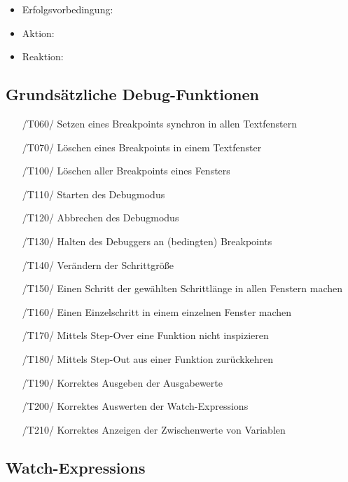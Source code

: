 \documentclass[parskip=full]{scrartcl}
\begin{document}
	
	
	\begin{itemize}
		\item Erfolgsvorbedingung:
		
		
		\item Aktion:
		
		
		\item Reaktion:
		
		
	\end{itemize}	

\subsection{Grundsätzliche Debug-Funktionen}

\begin{itemize}

	\item[/T060/] Setzen eines \glspl{Breakpoint} synchron in allen Textfenstern
	\item[/T070/] Löschen eines \glspl{Breakpoint} in einem Textfenster
	\item[/T100/] Löschen aller \glspl{Breakpoint} eines Fensters
	\item[/T110/] Starten des \gls{Debugmodus}
	\item[/T120/] Abbrechen des \gls{Debugmodus}
	\item[/T130/] Halten des Debuggers an (bedingten) \glspl{Breakpoint}
	\item[/T140/] Verändern der Schrittgröße
	\item[/T150/] Einen \gls{Schritt} der gewählten Schrittlänge in allen Fenstern machen
	\item[/T160/] Einen \gls{Einzelschritt} in einem einzelnen Fenster machen
	\item[/T170/] Mittels \gls{Step-Over} eine Funktion nicht inspizieren
	\item[/T180/] Mittels \gls{Step-Out} aus einer Funktion zurückkehren
	\item[/T190/] Korrektes Ausgeben der Ausgabewerte
	\item[/T200/] Korrektes Auswerten der \glspl{Watch-Expression}
	\item[/T210/] Korrektes Anzeigen der Zwischenwerte von Variablen
	
\end{itemize}


\subsection{Watch-Expressions}
\end{document}
